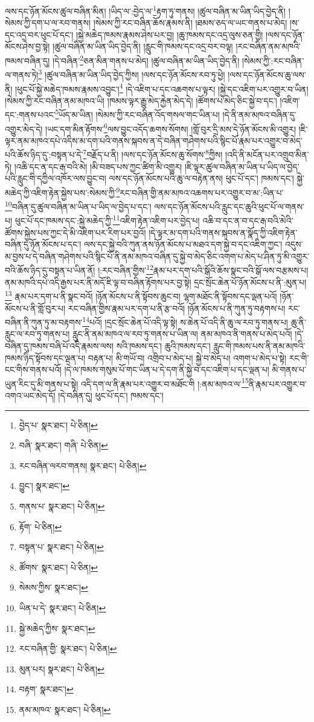 ལས་དང་ཉོན་མོངས་ཚུལ་བཞིན་མིན། །ཡིད་ལ་:བྱེད་ལ་\footnote{བྱེད་པ་  སྣར་ཐང་།  པེ་ཅིན། }རྟག་ཏུ་གནས། །ཚུལ་བཞིན་མ་ཡིན་ཡིད་བྱེད་ནི། །སེམས་ཀྱི་དག་པ་ལ་རབ་གནས། །སེམས་ཀྱི་རང་བཞིན་ཆོས་རྣམས་ནི། །ཐམས་ཅད་ལ་ཡང་གནས་པ་མེད། །ས་དང་འདྲ་བར་ཕུང་པོ་དང་། །སྐྱེ་མཆེད་ཁམས་རྣམས་ཤེས་པར་བྱ། །ཆུ་ཁམས་དང་འདྲ་ལུས་ཅན་གྱི། །ལས་དང་ཉོན་མོངས་ཤེས་བྱ་སྟེ། །ཚུལ་བཞིན་མ་ཡིན་ཡིད་བྱེད་ནི། །རླུང་གི་ཁམས་དང་འདྲ་བར་བལྟ། །རང་བཞིན་ནམ་མཁའི་ཁམས་བཞིན་དུ། །དེ་བཞིན་\footnote{བཞི་  སྣར་ཐང་། གཞི་  པེ་ཅིན། }ཅན་མིན་གནས་པ་མེད། །ཚུལ་བཞིན་མ་ཡིན་ཡིད་བྱེད་ནི། །སེམས་ཀྱི་:རང་བཞིན་ལ་གནས་ཏེ།\footnote{རང་བཞིན་ལརབ་གནས།  སྣར་ཐང་།  པེ་ཅིན། } །ཚུལ་བཞིན་མ་ཡིན་ཡིད་བྱེད་ཀྱིས། །ལས་དང་ཉོན་མོངས་རབ་ཏུ་ཕྱེ། །ལས་དང་ཉོན་མོངས་ཆུ་ལས་ནི། །ཕུང་པོ་སྐྱེ་མཆེད་ཁམས་རྣམས་འབྱུང་།\footnote{བྱུང་།  སྣར་ཐང་། } །དེ་འཇིག་པ་དང་འཆགས་པ་ལྟར། །སྐྱེ་དང་འཇིག་པར་འགྱུར་བ་ཡིན། །སེམས་ཀྱི་རང་བཞིན་ནམ་མཁའ་ཡི། །ཁམས་ལྟར་རྒྱུ་མེད་རྐྱེན་མེད་དེ། །ཚོགས་པ་མེད་ཅིང་སྐྱེ་བ་དང་། །འཇིག་དང་:གནས་པའང་\footnote{གནས་པ་  སྣར་ཐང་།  པེ་ཅིན། }ཡོད་མ་ཡིན། །སེམས་ཀྱི་རང་བཞིན་འོད་གསལ་གང་ཡིན་པ། །དེ་ནི་ནམ་མཁའ་བཞིན་དུ་འགྱུར་མེད་དེ། །ཡང་དག་མིན་རྟོགས་\footnote{རྟོག་  པེ་ཅིན། }ལས་བྱུང་འདོད་ཆགས་སོགས། །གློ་བུར་དྲི་མས་དེ་ཉོན་མོངས་མི་འགྱུར། །ཇི་ལྟར་ནམ་མཁའ་དཔེ་འདིས་མ་དག་པའི་གནས་སྐབས་ན་དེ་བཞིན་གཤེགས་པའི་སྙིང་པོ་རྣམ་པར་འགྱུར་བ་མེད་པའི་ཆོས་ཉིད་དུ་:བསྟན་པ་དེ་\footnote{བསྟན་པ་  སྣར་ཐང་།  པེ་ཅིན། }བརྗོད་པ་ནི། །ལས་དང་ཉོན་མོངས་ཆུ་སོགས་\footnote{ཚོགས་  སྣར་ཐང་།  པེ་ཅིན། }ཀྱིས། །འདི་ནི་མངོན་པར་འགྲུབ་མིན་ཏེ། །འཆི་དང་ན་དང་རྒ་བའི་མེ། །མི་བཟད་པས་ཀྱང་ཚིག་མི་འགྱུར། །ཇི་ལྟར་ཚུལ་བཞིན་མ་ཡིན་པ་ཡིད་ལ་བྱེད་པའི་རླུང་གི་དཀྱིལ་འཁོར་ལས་བྱུང་བ། ལས་དང་ཉོན་མོངས་པའི་ཆུ་ལ་བརྟེན་ནས། ཕུང་པོ་དང་། ཁམས་དང་། སྐྱེ་མཆེད་ཀྱི་འཇིག་རྟེན་སྐྱེས་པས་:སེམས་ཀྱི་\footnote{སེམས་ཀྱིས་  སྣར་ཐང་། }རང་བཞིན་གྱི་ནམ་མཁའ་འཆགས་པར་འགྱུར་བ་མ་:ཡིན་པ་\footnote{ཡིན་པ་དེ་  སྣར་ཐང་།  པེ་ཅིན། }བཞིན་དུ་ཚུལ་བཞིན་མ་ཡིན་པ་ཡིད་ལ་བྱེད་པ་དང་། ལས་དང་ཉོན་མོངས་པའི་རླུང་དང་ཆུའི་ཕུང་པོ་ལ་གནས་པ། ཕུང་པོ་དང་ཁམས་དང་:སྐྱེ་མཆེད་ཀྱི་\footnote{སྐྱེ་མཆེད་ཀྱིས་  སྣར་ཐང་། }འཇིག་རྟེན་འཇིག་པར་བྱེད་པ། འཆི་བ་དང་ན་བ་དང་རྒ་བའི་མེའི་ཚོགས་སྐྱེས་པས་ཀྱང་དེ་མི་འཇིག་པར་རིག་པར་བྱའོ། །དེ་ལྟར་མ་དག་པའི་གནས་སྐབས་ན་སྣོད་ཀྱི་འཇིག་རྟེན་བཞིན་དུ་ཉོན་མོངས་པ་དང་། ལས་དང་སྐྱེ་བའི་ཀུན་ནས་ཉོན་མོངས་པ་མཐའ་དག་སྐྱེ་བ་དང་འཇིག་ཀྱང་། འདུས་མ་བྱས་པ་དེ་བཞིན་གཤེགས་པའི་སྙིང་པོ་ནི་ནམ་མཁའ་བཞིན་དུ་སྐྱེ་བ་མེད་ཅིང་འགག་པ་མེད་པ་ཤིན་ཏུ་མི་འགྱུར་བའི་ཆོས་ཉིད་དུ་བསྟན་པ་ཡིན་ནོ། །:རང་བཞིན་གྱིས་\footnote{རང་བཞིན་གྱི་  སྣར་ཐང་།  པེ་ཅིན། }རྣམ་པར་དག་པའི་སྒོའི་ཆོས་སྣང་བའི་སྒོ་ལས་བརྩམས་པ། ནམ་མཁའི་དཔེ་འདི་རྒྱས་པར་ནི་མདོ་ཇི་ལྟ་བ་བཞིན་རྟོགས་པར་བྱ་སྟེ། དྲང་སྲོང་ཆེན་པོ་ཉོན་མོངས་པ་ནི་:མུན་པ།\footnote{མུན་པར།  སྣར་ཐང་།  པེ་ཅིན། } རྣམ་པར་དག་པ་ནི་སྣང་བའོ། །ཉོན་མོངས་པ་ནི་སྟོབས་ཆུང་བ། ལྷག་མཐོང་ནི་སྟོབས་དང་ལྡན་པའོ། །ཉོན་མོངས་པ་ནི་གློ་བུར་པ། རང་བཞིན་གྱིས་རྣམ་པར་དག་པ་ནི་རྩ་བའོ། །ཉོན་མོངས་པ་ནི་ཀུན་ཏུ་བརྟགས་པ། རང་བཞིན་ནི་ཀུན་ཏུ་མ་བརྟགས་\footnote{བརྟག་  སྣར་ཐང་། }པའོ། །དྲང་སྲོང་ཆེན་པོ་འདི་ལྟ་སྟེ། ས་ཆེན་པོ་འདི་ནི་ཆུ་ལ་རབ་ཏུ་གནས་པ། ཆུ་ནི་རླུང་ལ་རབ་ཏུ་གནས་པ། རླུང་ནི་ནམ་མཁའ་ལ་རབ་ཏུ་གནས་པ་ཡིན་ལ། ནམ་མཁའ་ནི་གནས་པ་མེད་པའོ། །དེ་བཞིན་དུ་ཁམས་བཞི་པོ་འདི་རྣམས་ལས། སའི་ཁམས་དང་། ཆུའི་ཁམས་དང་། རླུང་གི་ཁམས་པས་ནི་ནམ་མཁའི་ཁམས་ཉིད་སྟོབས་དང་ལྡན་པ། བརྟན་པ། མི་གཡོ་བ། འགྲིབ་པ་མེད་པ། སྐྱེ་བ་མེད་པ། འགག་པ་མེད་པ་སྟེ། རང་གི་ངང་གིས་གནས་པའོ། །དེ་ལ་ཁམས་གསུམ་པོ་གང་ཡིན་པ་དེ་དག་ནི་སྐྱེ་བ་དང་འཇིག་པ་དང་ལྡན་པ། མི་གནས་པ་ཡུན་རིང་དུ་མི་གནས་པ་སྟེ། འདི་དག་ལ་ནི་རྣམ་པར་འགྱུར་བ་མཐོང་གི །:ནམ་མཁའ་ལ་\footnote{ནམ་མཁའ་  སྣར་ཐང་།  པེ་ཅིན། }ནི་རྣམ་པར་འགྱུར་བ་འགའ་ཡང་མེད་དོ། །དེ་བཞིན་དུ། ཕུང་པོ་དང་། ཁམས་དང་། 